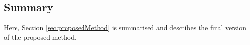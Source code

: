 
% 

\subsection{Summary}
Here, Section \ref{sec:proposedMethod} is summarised and describes the final version of the proposed method.

